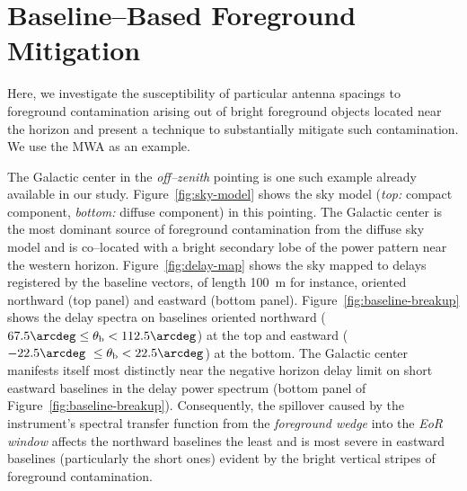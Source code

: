 \documentclass[preprint2,iop,numberedappendix,twocolappendix,appendixfloats]{emulateapj}
\begin{document}
\section{Baseline--Based Foreground Mitigation}\label{sec:fg-grading}

Here, we investigate the susceptibility of particular antenna spacings to foreground contamination arising out of bright foreground objects located near the horizon and present a technique to substantially mitigate such contamination. We use the MWA as an example.

The Galactic center in the {\it off--zenith} pointing is one such example already available in our study. Figure~\ref{fig:sky-model} shows the sky model ({\it top:} compact component, {\it bottom:} diffuse component) in this pointing. The Galactic center is the most dominant source of foreground contamination from the diffuse sky model and is co--located with a bright secondary lobe of the power pattern near the western horizon. Figure~\ref{fig:delay-map} shows the sky mapped to delays registered by the baseline vectors, of length 100~m for instance, oriented northward (top panel) and eastward (bottom panel). Figure~\ref{fig:baseline-breakup} shows the delay spectra on baselines oriented northward ($67.5\arcdeg\le \theta_\textrm{b} < 112.5\arcdeg$) at the top and eastward ($-22.5\arcdeg~\le \theta_\textrm{b} < 22.5\arcdeg$) at the bottom. The Galactic center manifests itself most distinctly near the negative horizon delay limit on short eastward baselines in the delay power spectrum (bottom panel of Figure~\ref{fig:baseline-breakup}). Consequently, the spillover caused by the instrument's spectral transfer function from the {\it foreground wedge} into the {\it EoR window} affects the northward baselines the least and is most severe in eastward baselines (particularly the short ones) evident by the bright vertical stripes of foreground contamination. 
\end{document}
